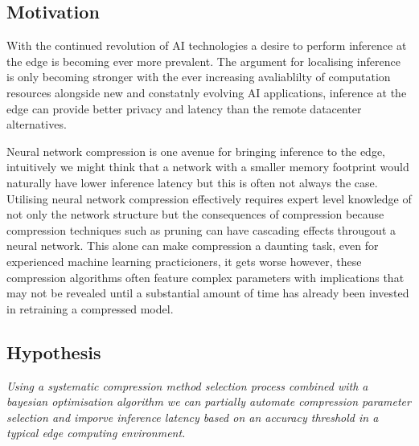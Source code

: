 \documentclass[../D1.tex]{subfiles}
\begin{document}
\subsection{Motivation}
With the continued revolution of AI technologies a desire to perform inference at the edge is becoming ever more prevalent.
The argument for localising inference is only becoming stronger with the ever increasing avaliablilty of computation resources alongside new and constatnly evolving AI applications, inference at the edge can provide better privacy and latency than the remote datacenter alternatives.


Neural network compression is one avenue for bringing inference to the edge, intuitively we might think that a network with a smaller memory footprint would naturally have lower inference latency but this is often not always the case.
Utilising neural network compression effectively requires expert level knowledge of not only the network structure but the consequences of compression because compression techniques such as pruning can have cascading effects througout a neural network.
This alone can make compression a daunting task, even for experienced machine learning practicioners, it gets worse however, these compression algorithms often feature complex parameters with implications that may not be revealed until a substantial amount of time has already been invested in retraining a compressed model.



\subsection{Hypothesis}
\emph{Using a systematic compression method selection process combined with a bayesian optimisation algorithm we can partially automate compression parameter selection and imporve inference latency based on an accuracy threshold in a typical edge computing environment.}

\newpage
\end{document}
